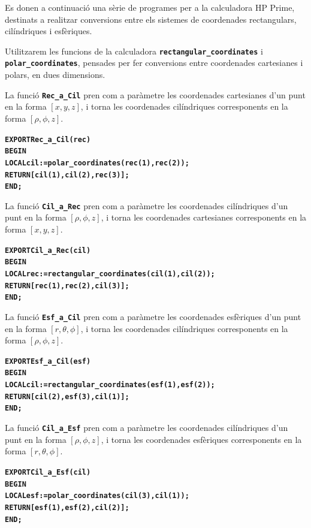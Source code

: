 \documentclass[catalan,a4paper,twoside,11pt]{article}
\begin{document}
Es donen a continuació una sèrie de programes per a la calculadora HP Prime, destinats a realitzar conversions entre els  sistemes de coordenades rectangulars, cilíndriques i esfèriques.

Utilitzarem les funcions de la calculadora \texttt{\textbf{rectangular\_coordinates}} i \texttt{\textbf{polar\_coordinates}}, pensades per fer conversions entre coordenades cartesianes i polars, en dues dimensions.

La funció \texttt{\textbf{Rec\_a\_Cil}} pren com a paràmetre les coordenades cartesianes d'un punt en la forma $[x,y,z]$, i torna les coordenades cilíndriques corresponents en la forma $[\rho,\phi,z]$.
\vspace{-6mm}
\begin{alltt}
\bfseries
    EXPORT Rec\_a\_Cil(rec)
    BEGIN
      LOCAL cil:=polar_coordinates(rec(1),rec(2));
      RETURN [cil(1),cil(2),rec(3)];
    END;
\end{alltt}

La funció \texttt{\textbf{Cil\_a\_Rec}} pren com a paràmetre les coordenades cilíndriques d'un punt en la forma $[\rho,\phi,z]$, i torna les coordenades cartesianes corresponents en la forma  $[x,y,z]$.
\vspace{-6mm}
\begin{alltt}
\bfseries
    EXPORT Cil\_a\_Rec(cil)
    BEGIN
      LOCAL rec:=rectangular_coordinates(cil(1),cil(2));
      RETURN [rec(1),rec(2),cil(3)];
    END;
\end{alltt}

La funció \texttt{\textbf{Esf\_a\_Cil}} pren com a paràmetre les coordenades esfèriques d'un punt en la forma $[r, \theta,\phi]$, i torna les coordenades cilíndriques corresponents en la forma  $[\rho,\phi,z]$.
\vspace{-6mm}
\begin{alltt}
\bfseries
    EXPORT Esf\_a\_Cil(esf)
    BEGIN
      LOCAL cil:=rectangular_coordinates(esf(1),esf(2));
      RETURN [cil(2),esf(3),cil(1)];
    END;
\end{alltt}

La funció \texttt{\textbf{Cil\_a\_Esf}} pren com a paràmetre les coordenades cilíndriques  d'un punt en la forma $[\rho,\phi,z]$, i torna les coordenades esfèriques corresponents en la forma $[r,\theta,\phi]$.
\vspace{-6mm}
\begin{alltt}
\bfseries
    EXPORT Cil\_a\_Esf(cil)
    BEGIN
      LOCAL esf:=polar_coordinates(cil(3),cil(1));
      RETURN [esf(1),esf(2),cil(2)];
    END;
\end{alltt}
\end{document}
